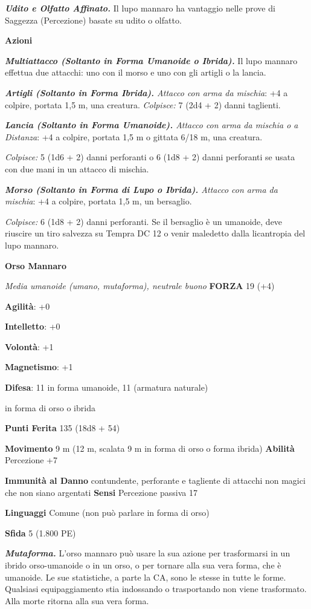 \begin{multicols}{2}
\emph{\textbf{Udito e Olfatto Affinato.}} Il lupo mannaro ha vantaggio
nelle prove di Saggezza (Percezione) basate su udito o olfatto.

\textbf{Azioni}

\emph{\textbf{Multiattacco (Soltanto in Forma Umanoide o Ibrida).}} Il
lupo mannaro effettua due attacchi: uno con il morso e uno con gli
artigli o la lancia.

\emph{\textbf{Artigli (Soltanto in Forma Ibrida).} Attacco con arma da
mischia}: +4 a colpire, portata 1,5 m, una creatura. \emph{Colpisce:} 7
(2d4 + 2) danni taglienti.

\emph{\textbf{Lancia (Soltanto in Forma Umanoide).} Attacco con arma da
mischia o a Distanza}: +4 a colpire, portata 1,5 m o gittata 6/18 m, una
creatura.

\emph{Colpisce:} 5 (1d6 + 2) danni perforanti o 6 (1d8 + 2) danni
perforanti se usata con due mani in un attacco di mischia.

\emph{\textbf{Morso (Soltanto in Forma di Lupo o Ibrida).} Attacco con
arma da mischia}: +4 a colpire, portata 1,5 m, un bersaglio.

\emph{Colpisce:} 6 (1d8 + 2) danni perforanti. Se il bersaglio è un
umanoide, deve riuscire un tiro salvezza su Tempra DC 12 o venir
maledetto dalla licantropia del lupo mannaro.

\textbf{Orso Mannaro}

\emph{Media umanoide (umano, mutaforma), neutrale buono} \textbf{FORZA}
19 (+4)

\textbf{Agilità}: +0

\textbf{Intelletto}: +0

\textbf{Volontà}: +1

\textbf{Magnetismo}: +1

\textbf{Difesa}: 11 in forma umanoide, 11 (armatura naturale)

in forma di orso o ibrida

\textbf{Punti Ferita} 135 (18d8 + 54)

\textbf{Movimento} 9 m (12 m, scalata 9 m in forma di orso o forma
ibrida) \textbf{Abilità} Percezione +7

\textbf{Immunità al Danno} contundente, perforante e tagliente di
attacchi non magici che non siano argentati \textbf{Sensi} Percezione
passiva 17

\textbf{Linguaggi} Comune (non può parlare in forma di orso)

\textbf{Sfida} 5 (1.800 PE)

\emph{\textbf{Mutaforma.}} L'orso mannaro può usare la sua azione per
trasformarsi in un ibrido orso-umanoide o in un orso, o per tornare alla
sua vera forma, che è umanoide. Le sue statistiche, a parte la CA, sono
le stesse in tutte le forme. Qualsiasi equipaggiamento stia indossando o
trasportando non viene trasformato. Alla morte ritorna alla sua vera
forma.


\end{multicols}
